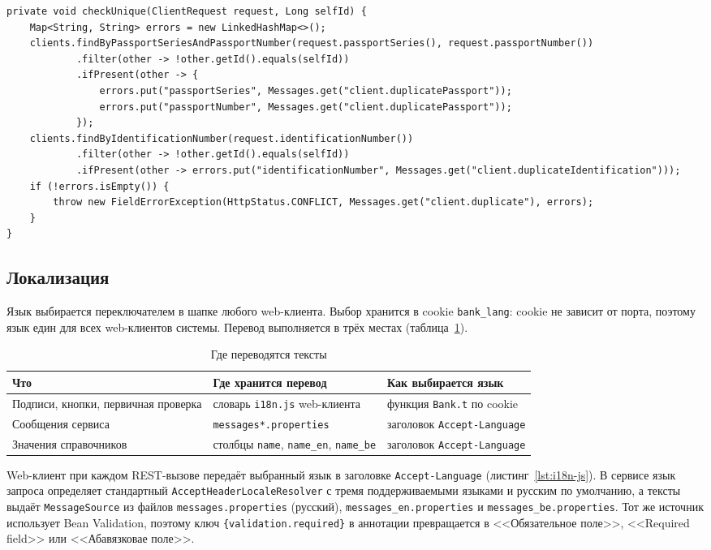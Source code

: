 \documentclass[14pt,a4paper]{extarticle}
\begin{document}
\begin{lstlisting}[style=java, caption={Проверка уникальности (\texttt{service/ClientService.java})}, label={lst:unique}]
private void checkUnique(ClientRequest request, Long selfId) {
    Map<String, String> errors = new LinkedHashMap<>();
    clients.findByPassportSeriesAndPassportNumber(request.passportSeries(), request.passportNumber())
            .filter(other -> !other.getId().equals(selfId))
            .ifPresent(other -> {
                errors.put("passportSeries", Messages.get("client.duplicatePassport"));
                errors.put("passportNumber", Messages.get("client.duplicatePassport"));
            });
    clients.findByIdentificationNumber(request.identificationNumber())
            .filter(other -> !other.getId().equals(selfId))
            .ifPresent(other -> errors.put("identificationNumber", Messages.get("client.duplicateIdentification")));
    if (!errors.isEmpty()) {
        throw new FieldErrorException(HttpStatus.CONFLICT, Messages.get("client.duplicate"), errors);
    }
}
\end{lstlisting}

\subsection{Локализация}

Язык выбирается переключателем в шапке любого web-клиента. Выбор хранится в cookie
\texttt{bank\_lang}: cookie не зависит от порта, поэтому язык един для всех web-клиентов
системы. Перевод выполняется в трёх местах (таблица~\ref{tab:i18n}).

\begin{table}[H]
\caption{Где переводятся тексты}
\label{tab:i18n}
\centering
\small
\begin{tabularx}{\textwidth}{lXX}
\toprule
Что & Где хранится перевод & Как выбирается язык \\
\midrule
Подписи, кнопки, первичная проверка & словарь \texttt{i18n.js} web-клиента & функция \texttt{Bank.t} по cookie \\
Сообщения сервиса & \texttt{messages*.properties} & заголовок \texttt{Accept-Language} \\
Значения справочников & столбцы \texttt{name}, \texttt{name\_en}, \texttt{name\_be} & заголовок \texttt{Accept-Language} \\
\bottomrule
\end{tabularx}
\end{table}

Web-клиент при каждом REST-вызове передаёт выбранный язык в заголовке
\texttt{Accept-Language} (листинг~\ref{lst:i18n-js}). В сервисе язык запроса определяет
стандартный \texttt{AcceptHeaderLocaleResolver} с тремя поддерживаемыми языками и русским по
умолчанию, а тексты выдаёт \texttt{MessageSource} из файлов \texttt{messages.properties}
(русский), \texttt{messages\_en.properties} и \texttt{messages\_be.properties}. Тот же
источник использует Bean Validation, поэтому ключ \texttt{\{validation.required\}} в
аннотации превращается в <<Обязательное поле>>, <<Required field>> или <<Абавязковае поле>>.
\end{document}

